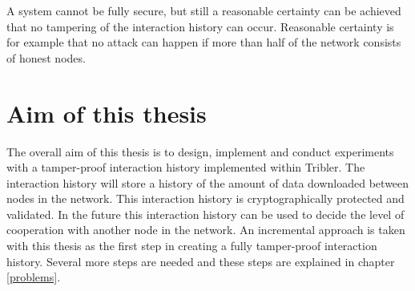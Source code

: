 A system cannot be fully secure, 
but still a reasonable certainty can be achieved that no tampering of the interaction history can occur.
Reasonable certainty is for example that no attack can happen 
if more than half of the network consists of honest nodes.

\section{Aim of this thesis}
\label{pb-aim}
The overall aim of this thesis is to design, implement and conduct experiments with a tamper-proof interaction history
implemented within Tribler.
The interaction history will store a history of the amount of data downloaded between nodes in the network.
This interaction history is cryptographically protected and validated.
In the future this interaction history can be used to decide the level of cooperation with another node in the network.
An incremental approach is taken with this thesis as the first step in creating a fully tamper-proof interaction history.
Several more steps are needed and these steps are explained in chapter \ref{problems}.
